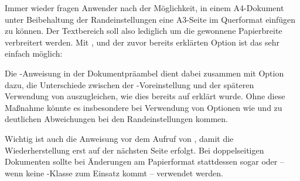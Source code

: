 \begin{Example}
  Immer wieder fragen Anwender nach der Möglichkeit, in einem A4-Dokument
  unter Beibehaltung der Randeinstellungen eine A3-Seite im Querformat
  einfügen zu können. Der Textbereich soll also lediglich um die gewonnene
  Papierbreite verbreitert werden. Mit ,
   und der zuvor bereits erklärten Option
   ist das sehr einfach möglich:
  Die -Anweisung in der
  Dokumentpräambel dient dabei zusammen mit Option
  dazu, die Unterschiede zwischen der
  -Voreinstellung und der späteren Verwendung
  von  auszugleichen, wie dies bereits auf
   erklärt wurde. Ohne diese
  Maßnahme könnte es insbesondere bei Verwendung von Optionen wie
   und
   zu deutlichen Abweichungen bei den
  Randeinstellungen kommen.
  
  Wichtig ist auch die Anweisung
   vor dem Aufruf von
  , damit die Wiederherstellung erst auf der
  nächsten Seite erfolgt. Bei doppelseitigen Dokumenten sollte bei Änderungen
  am Papierformat stattdessen sogar
   oder
  -- wenn keine \KOMAScript-Klasse zum Einsatz kommt --
   verwendet
  werden.%
\end{Example}

